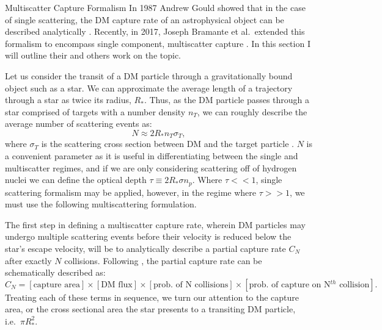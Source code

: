 \documentclass[a4paper,11pt]{article}
\begin{document}
\begin{section}{Multiscatter Capture Formalism}
    In 1987 Andrew Gould showed that in the case of single scattering, the DM capture rate of an astrophysical object can be described analytically \cite{Gould:1987}.
    Recently, in 2017, Joseph Bramante et al.~extended this formalism to encompass single component, multiscatter capture \cite{Bramante:2017}. In this section I will outline their and others work on the topic.

    Let us consider the transit of a DM particle through a gravitationally bound object such as a star.
    We can approximate the average length of a trajectory through a star as twice its radius, $R_{*}$.
    Thus, as the DM particle passes through a star comprised of targets with a number density $n_T$, we can roughly describe the average number of scattering events as: 
    \begin{equation}
    N \approx 2 R_{*} n_T \sigma_T,
    \end{equation}
    where $\sigma_T$ is the scattering cross section between DM and the target particle \cite{Bramante:2017}.
    $N$ is a convenient parameter as it is useful in differentiating between the single and multiscatter regimes, and if we are only considering scattering off of hydrogen nuclei we can define the optical depth $\tau \equiv 2R_{*} \sigma n_p$.
    Where $\tau << 1$, single scattering formalism may be applied, however, in the regime where $\tau >> 1$, we must use the following multiscattering formulation.

    The first step in defining a multiscatter capture rate, wherein DM particles may undergo multiple scattering events before their velocity is reduced below the star's escape velocity, will be to analytically describe a partial capture rate $C_N$ after exactly $N$ collisions. Following \cite{Bramante:2017}, the partial capture rate can be schematically described as:
    $$ C_N = [\text{capture area}] \times [\text{DM flux}] \times [\text{prob. of N collisions}] \times [\text{prob. of capture on N$^{th}$ collision}]. $$
    Treating each of these terms in sequence, we turn our attention to the capture area, or the cross sectional area the star presents to a transiting DM particle, i.e.~$\pi R_*^2$.


\end{section}
\end{document}
